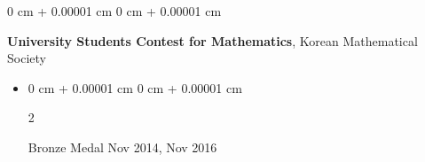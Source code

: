 \documentclass[10pt, letterpaper]{article}
\newenvironment{highlights}{
    \begin{itemize}[
        topsep=0.10 cm,
        parsep=0.10 cm,
        partopsep=0pt,
        itemsep=0pt,
        leftmargin=0 cm + 10pt
    ]
}{
    \end{itemize}
} %
\newenvironment{onecolentry}{
    \begin{adjustwidth}{
        0 cm + 0.00001 cm
    }{
        0 cm + 0.00001 cm
    }
}{
    \end{adjustwidth}
} %
\newenvironment{twocolentry}[2][]{
    \onecolentry
    \def\secondColumn{#2}
    \setcolumnwidth{\fill, 4.5 cm}
    \begin{paracol}{2}
}{
    \switchcolumn \raggedleft \secondColumn
    \end{paracol}
    \endonecolentry
} %
\begin{document}
    \begin{onecolentry}
        \textbf{University Students Contest for Mathematics}, Korean Mathematical Society
        \begin{highlights}
            \item \begin{twocolentry}{Nov 2014, Nov 2016}
            Bronze Medal \end{twocolentry}
        \end{highlights}
    \end{onecolentry}
    





\end{document}
